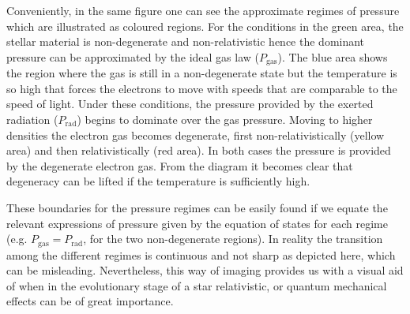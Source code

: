 \documentclass[../../main/thesis_msc.tex]{subfiles}
\begin{document}
				Conveniently, in the same figure one can see the approximate regimes of pressure which are illustrated as coloured regions. For the conditions in the green area, the stellar material is non-degenerate and non-relativistic hence the dominant pressure can be approximated by the ideal gas law ($P_{\text{gas}}$). The blue area shows the region where the gas is still in a non-degenerate state but the temperature is so high that forces the electrons to move with speeds that are comparable to the speed of light. Under these conditions, the pressure provided by the exerted radiation ($P_{\text{rad}}$) begins to dominate over the gas pressure. Moving to higher densities the electron gas becomes degenerate, first non-relativistically (yellow area) and then relativistically (red area). In both cases the pressure is provided by the degenerate electron gas. From the diagram it becomes clear that degeneracy can be lifted if the temperature is sufficiently high.
				
				These boundaries for the pressure regimes can be easily found if we equate the relevant expressions of pressure given by the equation of states for each regime (e.g. $P_{\text{gas}} = P_{\text{rad}}$, for the two non-degenerate regions). In reality the transition among the different regimes is continuous and not sharp as depicted here, which can be misleading. Nevertheless, this way of imaging provides us with a visual aid of when in the evolutionary stage of a star relativistic, or quantum mechanical effects can be of great importance.
				
\end{document}
